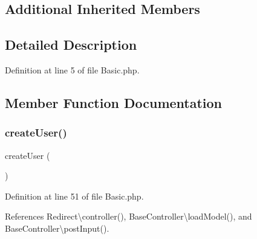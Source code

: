 \subsection*{Additional Inherited Members}


\subsection{Detailed Description}


Definition at line 5 of file Basic.\+php.



\subsection{Member Function Documentation}
\hypertarget{class_basic_a967982ee98f05287bbdba812f6016947}{}\label{class_basic_a967982ee98f05287bbdba812f6016947} 
\subsubsection{\texorpdfstring{create\+User()}{createUser()}}
{\footnotesize\ttfamily create\+User (\begin{DoxyParamCaption}{ }\end{DoxyParamCaption})}



Definition at line 51 of file Basic.\+php.



References Redirect\textbackslash{}controller(), Base\+Controller\textbackslash{}load\+Model(), and Base\+Controller\textbackslash{}post\+Input().


\hypertarget{class_basic_a934aeeec370d904f3a58bde4d514259d}{}\label{class_basic_a934aeeec370d904f3a58bde4d514259d} 
